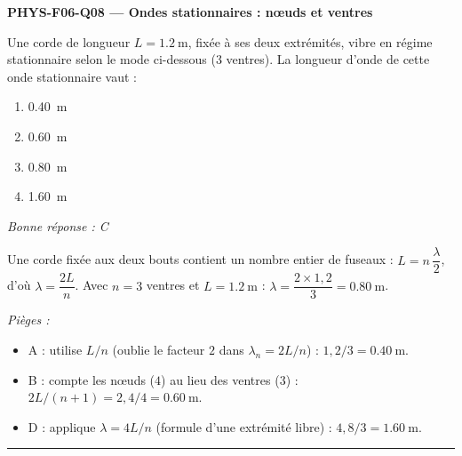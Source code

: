 \documentclass[11pt,a4paper]{article}
\begin{document}
\noindent\textbf{PHYS-F06-Q08 --- Ondes stationnaires : nœuds et ventres}\par
Une corde de longueur $L = \qty{1.2}{\metre}$, fixée à ses deux extrémités, vibre en régime stationnaire selon le mode ci-dessous (3 ventres). La longueur d'onde de cette onde stationnaire vaut :
\begin{center}
\end{center}
\begin{enumerate}[label=\Alph*)]
\item \qty{0.40}{\metre}
\item \qty{0.60}{\metre}
\item \qty{0.80}{\metre}
\item \qty{1.60}{\metre}
\end{enumerate}
\textit{Bonne réponse : C}\par
Une corde fixée aux deux bouts contient un nombre entier de fuseaux : $L = n\,\dfrac{\lambda}{2}$, d'où $\lambda = \dfrac{2L}{n}$. Avec $n = 3$ ventres et $L = \qty{1.2}{\metre}$ : $\lambda = \dfrac{2\times1{,}2}{3} = \qty{0.80}{\metre}$.\par
\textit{Pièges :}
\begin{itemize}
\item A : utilise $L/n$ (oublie le facteur $2$ dans $\lambda_n = 2L/n$) : $1{,}2/3 = \qty{0.40}{\metre}$.
\item B : compte les nœuds ($4$) au lieu des ventres ($3$) : $2L/(n{+}1) = 2{,}4/4 = \qty{0.60}{\metre}$.
\item D : applique $\lambda = 4L/n$ (formule d'une extrémité libre) : $4{,}8/3 = \qty{1.60}{\metre}$.
\end{itemize}
\vspace{8pt}\hrule\vspace{8pt}
\end{document}
